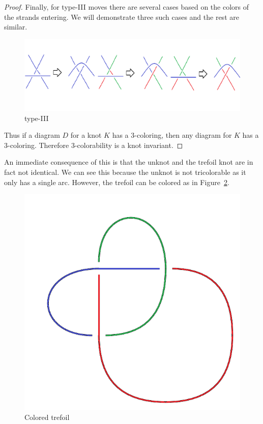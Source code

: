 \documentclass[12pt]{amsart}
\theoremstyle{definition}
\theoremstyle{remark}
\numberwithin{equation}{section}
\newcommand{\ds}{.3}
\begin{document}
\begin{proof}
  Finally, for type-III moves there are several cases based on
  the colors of the strands entering. We will demonstrate
  three such cases and the rest are similar.
  \begin{figure}
    \includegraphics[scale=\ds]{t3-c}
    \caption{type-III}
    \label{fig:t3-c}
  \end{figure}

  Thus if a diagram $D$ for a knot $K$ has a $3$-coloring, then
  any diagram for $K$ has a $3$-coloring. Therefore $3$-colorability
  is a knot invariant.
\end{proof}

An immediate consequence of this is that the unknot and the trefoil
knot are in fact not identical. We can see this because the unknot
is not tricolorable as it only has a single arc. However, the
trefoil can be colored as in Figure~\ref{fig:trefoil-c}.

\begin{figure}
  \includegraphics[scale=\ds]{trefoil-c}
  \caption{Colored trefoil}
  \label{fig:trefoil-c}
\end{figure}
\end{document}
